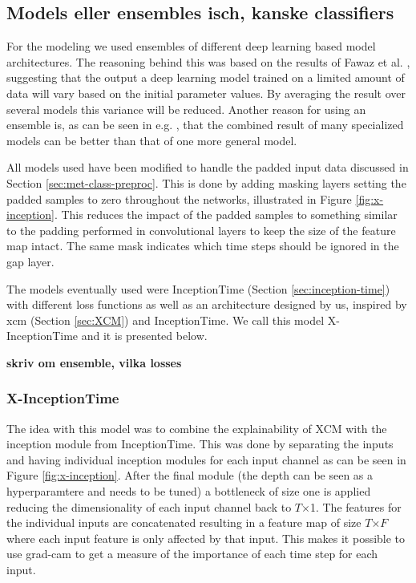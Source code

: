 \subsection{Models eller ensembles isch, kanske classifiers}
For the modeling we used ensembles of different deep learning based model architectures. The reasoning behind this was based on the results of Fawaz et al. \cite{IsmailFawaz2019ensemble}, suggesting that the output a deep learning model trained on a limited amount of data will vary based on the initial parameter values. By averaging the result over several models this variance will be reduced. Another reason for using an ensemble is, as can be seen in e.g. \cite{Bagnall2015, Lines2016}, that the combined result of many specialized models can be better than that of one more general model. %

All models used have been modified to handle the padded input data discussed in Section \ref{sec:met-class-preproc}. This is done by adding masking layers setting the padded samples to zero throughout the networks, illustrated in Figure \ref{fig:x-inception}. This reduces the impact of the padded samples to something similar to the padding performed in convolutional layers to keep the size of the feature map intact. The same mask indicates which time steps should be ignored in the \gls{gap} layer.

The models eventually used were InceptionTime (Section \ref{sec:inception-time}) with different loss functions as well as an architecture designed by us, inspired by
\gls{xcm} (Section \ref{sec:XCM}) and InceptionTime. We call this model X-InceptionTime and it is presented below.

\textbf{skriv om ensemble, vilka losses}

\subsubsection{X-InceptionTime}
The idea with this model was to combine the explainability of XCM with the inception module from InceptionTime. This was done by separating the inputs and having individual inception modules for each input channel as can be seen in Figure \ref{fig:x-inception}. After the final module (the depth can be seen as a hyperparamtere and needs to be tuned) a bottleneck of size one is applied reducing the dimensionality of each input channel back to $T$$\times$1. The features for the individual inputs are concatenated resulting in a feature map of size $T$$\times$$F$ where each input feature is only affected by that input. This makes it possible to use \gls{grad-cam} to get a measure of the importance of each time step for each input.

